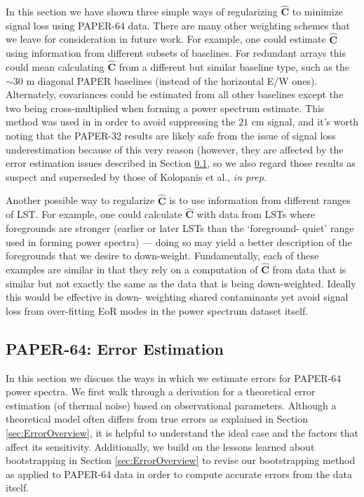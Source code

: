 \documentclass[preprint2,numberedappendix,tighten]{aastex6}  %
\begin{document}
In this section we have shown three simple ways of regularizing $\hat{\textbf{C}}$ to minimize signal loss using PAPER-64 
data. There are many other weighting schemes that we leave for consideration in future work. For example, one could estimate 
$\hat{\textbf{C}}$ using information from different subsets of baselines. For redundant arrays this could mean calculating $
\hat{\textbf{C}}$ from a different but similar baseline type, such as the $\sim30$ m diagonal PAPER baselines (instead of the 
horizontal E/W ones). Alternately, covariances could be estimated from all other baselines except the two being cross-multiplied 
when forming a power spectrum estimate. This method was used in \citet{parsons_et_al2014} in order to avoid suppressing the 
$21$ cm signal, and it's worth noting that the PAPER-32 results are likely safe from the issue of signal loss underestimation 
because of this very reason (however, they are affected by the error estimation issues described in Section \ref{sec:Error}, so 
we also regard those results as suspect and superseded by those of Kolopanis et al., \textit{in prep}.

Another possible way to regularize $\hat{\textbf{C}}$ is to use information from different ranges of LST. For example, one could 
calculate $\hat{\textbf{C}}$ with data from LSTs where foregrounds are stronger (earlier or later LSTs than the `foreground-
quiet' range used in forming power spectra) --- doing so may yield a better description of the foregrounds that we desire to 
down-weight. Fundamentally, each of these examples are similar in that they rely on a computation of $\hat{\textbf{C}}$ from 
data that is similar but not exactly the same as the data that is being down-weighted. Ideally this would be effective in down-
weighting shared contaminants yet avoid signal loss from over-fitting EoR modes in the power spectrum dataset itself. 


\subsection{PAPER-64: Error Estimation}
\label{sec:Error}

In this section we discuss the ways in which we estimate errors for PAPER-64 power spectra. We first walk through a derivation 
for a theoretical error estimation (of thermal noise) based on observational parameters. Although a theoretical model often 
differs from true errors as explained in Section \ref{sec:ErrorOverview}, it is helpful to understand the ideal case and the factors 
that affect its sensitivity. Additionally, we build on the lessons learned about bootstrapping in Section \ref{sec:ErrorOverview} to 
revise our bootstrapping method as applied to PAPER-64 data in order to compute accurate errors from the data itself.
\end{document}
